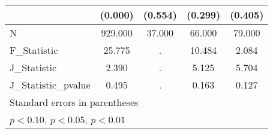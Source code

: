 {\begin{tabular}{l*{4}{c}}
            &     (0.000)         &     (0.554)         &     (0.299)         &     (0.405)         \\
\hline
N           &     929.000         &      37.000         &      66.000         &      79.000         \\
F\_Statistic &      25.775         &           .         &      10.484         &       2.084         \\
J\_Statistic &       2.390         &           .         &       5.125         &       5.704         \\
J\_Statistic\_pvalue&       0.495         &           .         &       0.163         &       0.127         \\
\hline\hline
\multicolumn{5}{l}{\footnotesize Standard errors in parentheses}\\
\multicolumn{5}{l}{\footnotesize \sym{*} \(p<0.10\), \sym{**} \(p<0.05\), \sym{***} \(p<0.01\)}\\
\end{tabular}
}
